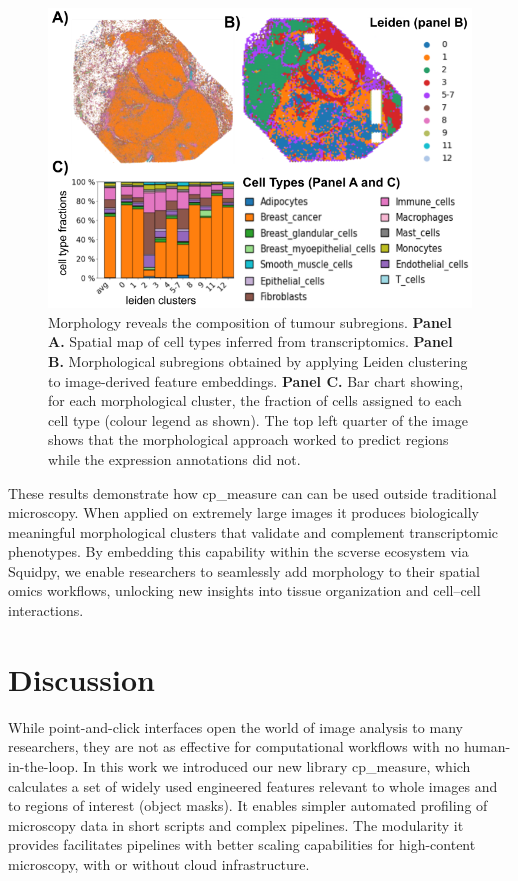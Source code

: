 \documentclass{article}
\begin{document}
\begin{figure}[htbp]
\centering
\includegraphics[width=.99\linewidth]{./figs/fig_4_spatial.png}
\caption{\label{fig:spatial_omics}{}Morphology reveals the composition of tumour subregions. \textbf{Panel A.} Spatial map of cell types inferred from transcriptomics. \textbf{Panel B.} Morphological subregions obtained by applying Leiden clustering to image-derived feature embeddings. \textbf{Panel C.} Bar chart showing, for each morphological cluster, the fraction of cells assigned to each cell type (colour legend as shown). The top left quarter of the image shows that the morphological approach worked to predict regions while the expression annotations did not.}
\end{figure}

These results demonstrate how cp\_measure can can be used outside traditional microscopy. When applied on extremely large images it produces biologically meaningful morphological clusters that validate and complement transcriptomic phenotypes. By embedding this capability within the scverse ecosystem via Squidpy, we enable researchers to seamlessly add morphology to their spatial omics workflows, unlocking new insights into tissue organization and cell–cell interactions.

\section{Discussion}
\label{sec:orgf37b369}
While point-and-click interfaces open the world of image analysis to many researchers, they are not as effective for computational workflows with no human-in-the-loop. In this work we introduced our new library cp\_measure, which calculates a set of widely used engineered features relevant to whole images and to regions of interest (object masks). It enables simpler automated profiling of microscopy data in short scripts and complex pipelines. The modularity it provides facilitates pipelines with better scaling capabilities for high-content microscopy, with or without cloud infrastructure.
\end{document}
